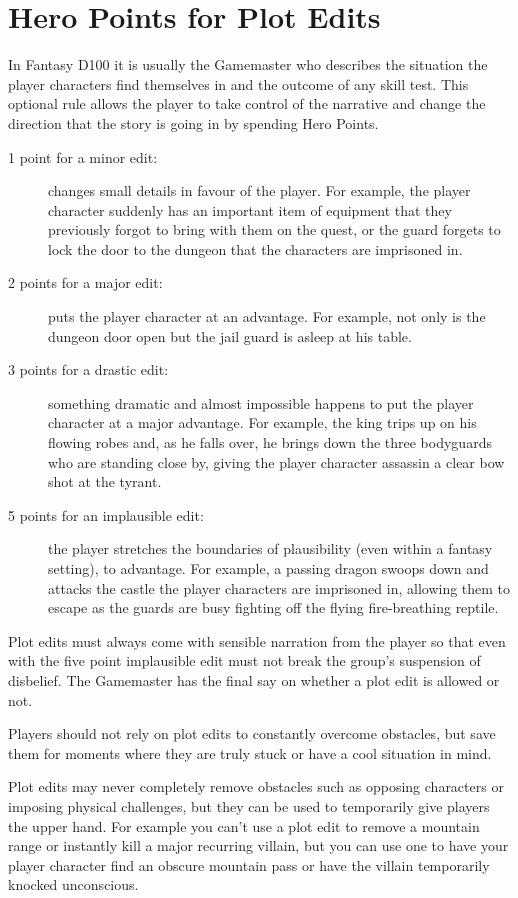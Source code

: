 \section{Hero Points for Plot Edits}
In Fantasy D100 it is usually the Gamemaster who describes the situation the player characters find themselves in and the outcome of any skill test. This optional rule allows the player to take control of the narrative and change the direction that the story is going in by spending Hero Points. 
\begin{description}
\item[1 point for a minor edit:] changes small details in favour of the player. For example, the player character suddenly has an important item of equipment that they previously forgot to bring with them on the quest, or the guard forgets to lock the door to the dungeon that the characters are imprisoned in.
\item[2 points for a major edit:] puts the player character at an advantage. For example, not only is the dungeon door open but the jail guard is asleep at his table.
\item[3 points for a drastic edit:] something dramatic and almost impossible happens to put the player character at a major advantage. For example, the king trips up on his flowing robes and, as he falls over, he brings down the three bodyguards who are standing close by, giving the player character assassin a clear bow shot at the tyrant.
\item[5 points for an implausible edit:] the player stretches the boundaries of plausibility (even within a fantasy setting), to advantage. For example, a passing dragon swoops down and attacks the castle the player characters are imprisoned in, allowing them to escape as the guards are busy fighting off the flying fire-breathing reptile.
\end{description}
Plot edits must always come with sensible narration from the player so that even with the five point implausible edit must not break the group’s suspension of disbelief. The Gamemaster has the final say on whether a plot edit is allowed or not.

Players should not rely on plot edits to constantly overcome obstacles, but save them for moments where they are truly stuck or have a cool situation in mind.

Plot edits may never completely remove obstacles such as opposing characters or imposing physical challenges, but they can be used to temporarily give players the upper hand. For example you can’t use a plot edit to remove a mountain range or instantly kill a major recurring villain, but you can use one to have your player character find an obscure mountain pass or have the villain temporarily knocked unconscious.


